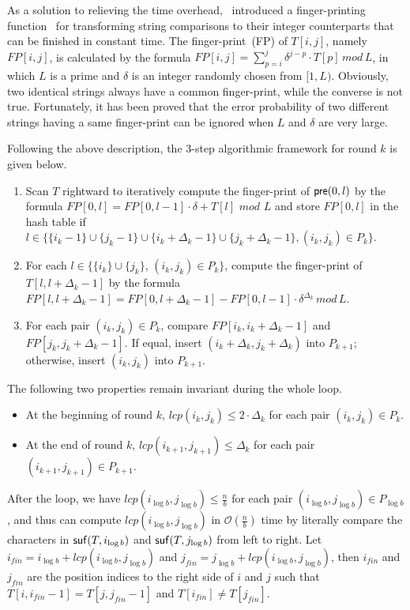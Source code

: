 \documentclass{llncs}
\begin{document}
As a solution to relieving the time overhead,~\cite{Philip2013} introduced a finger-printing function~\cite{Karp1987} for transforming string comparisons to their integer counterparts that can be finished in constant time. The finger-print~(FP) of $T[i,j]$, namely $FP[i,j]$, is calculated by the formula $FP[i,j] = \sum_{p=i}^{j} \delta^{j-p} \cdot T[p] \, mod \, L$, in which $L$ is a prime and $\delta$ is an integer randomly chosen from $[1,L)$. Obviously, two identical strings always have a common finger-print, while the converse is not true. Fortunately, it has been proved that the error probability of two different strings having a same finger-print can be ignored when $L$ and $\delta$ are very large.

Following the above description, the 3-step algorithmic framework for round $k$ is given below.

\begin{enumerate}[S1.]
\item Scan $T$ rightward to iteratively compute the finger-print of ${\sf pre}(0,l)$ by the formula $FP[0,l] = FP[0,l-1] \cdot \delta + T[l] \,\, mod \,\, L$ and store $FP[0,l]$ in the hash table if $l\in \{ \{i_k-1\}\cup\{j_k-1\}\cup\{i_k +\Delta_{k} - 1\}\cup\{j_k+ \Delta_{k} - 1\},(i_k,j_k)\in P_k\}$.
\item For each $l\in \{\{i_k\}\cup \{j_k\}$, $(i_k,j_k)\in P_k\}$, compute the finger-print of $T[l,l+\Delta_{k} - 1]$ by the formula $FP[l,l+ \Delta_{k} - 1]=FP[0,l+ \Delta_{k} - 1] - FP[0,l-1] \cdot \delta^{\Delta_{k}} \, mod \, L$.
\item For each pair $(i_k,j_k)\in P_k$, compare $FP[i_k,i_k+\Delta_{k} - 1]$ and $FP[j_k,j_k+\Delta_{k} - 1]$. If equal, insert $(i_k+\Delta_{k},j_k+\Delta_{k})$ into $P_{k+1}$; otherwise, insert $(i_k, j_k)$ into $P_{k+1}$.
\end{enumerate}

The following two properties remain invariant during the whole loop.

\begin{itemize}
\item At the beginning of round $k$, $lcp(i_k,j_k) \le 2 \cdot \Delta_{k}$ for each pair $(i_k,j_k) \in P_k$.
\item At the end of round $k$, $lcp(i_{k+1},j_{k+1}) \le \Delta_{k}$ for each pair $(i_{k+1},j_{k+1}) \in P_{k+1}$.
\end{itemize}

After the loop, we have $lcp(i_{\log b},j_{\log b}) \le \frac{n}{b}$ for each pair $(i_{\log b},j_{\log b}) \in P_{\log b}$, and thus can compute $lcp(i_{\log b}, j_{\log b})$ in $\mathcal{O}(\frac{n}{b})$ time by literally compare the characters in ${\sf suf}(T,i_{\log b})$ and ${\sf suf}(T,j_{\log b})$ from left to right. Let $i_{fin} = i_{\log b} + lcp(i_{\log b}, j_{\log b})$ and $j_{fin}= j_{\log b} + lcp(i_{\log b}, j_{\log b})$, then $i_{fin}$ and $j_{fin}$ are the position indices to the right side of $i$ and $j$ such that $T[i,i_{fin}-1] = T[j,j_{fin}-1]$ and $T[i_{fin}] \neq T[j_{fin}]$.
\end{document}
